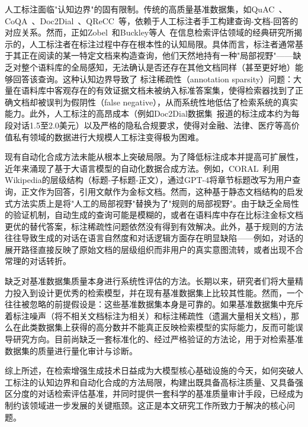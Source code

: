 人工标注面临"认知边界"的固有限制。传统的高质量基准数据集，如QuAC~\citep{choi-etal-2018-quac}、CoQA~\citep{reddy-etal-2019-coqa}、Doc2Dial~\citep{feng-etal-2020-doc2dial}、QReCC~\citep{anantha-etal-2021-qrecc}等，依赖于人工标注者手工构建查询-文档-回答的对应关系。然而，正如Zobel~\citep{zobel1998reliable}和Buckley等人~\citep{buckley2004retrieval}在信息检索评估领域的经典研究所揭示的，人工标注者在标注过程中存在根本性的认知局限。具体而言，标注者通常基于其正在阅读的某一特定文档来构造查询，他们天然地持有一种"局部视野"——缺乏对整个语料库的全局感知，无法确认是否还存在其他文档同样（甚至更好地）能够回答该查询。这种认知边界导致了 标注稀疏性（annotation sparsity）问题：大量在语料库中客观存在的有效证据文档未被纳入标准答案集，使得检索器找到了正确文档却被误判为假阴性（false negative），从而系统性地低估了检索系统的真实能力。此外，人工标注的高昂成本（例如Doc2Dial数据集~\citep{feng-etal-2020-doc2dial}报道的标注成本约为每段对话1.5至2.0美元）以及严格的隐私合规要求，使得对金融、法律、医疗等高价值私有领域的数据进行大规模人工标注变得极为困难。

现有自动化合成方法未能从根本上突破局限。为了降低标注成本并提高可扩展性，近年来涌现了基于大语言模型的自动化数据合成方法。例如，CORAL~\citep{coral2025}利用Wikipedia的层级结构（标题-子标题-正文），通过GPT-4将章节标题改写为用户查询，正文作为回答，引用文献作为金标文档。然而，这种基于静态文档结构的启发式方法实质上是将"人工的局部视野"替换为了"规则的局部视野"。由于缺乏全局性的验证机制，自动生成的查询可能是模糊的，或者在语料库中存在比标注金标文档更优的替代答案，标注稀疏性问题依然没有得到有效解决。此外，基于规则的方法往往导致生成的对话在语言自然度和对话逻辑方面存在明显缺陷——例如，对话的展开路径直接反映了原始文档的层级组织而非用户的真实意图流转，或者出现不合常理的对话转折。

缺乏对基准数据集质量本身进行系统性评估的方法。长期以来，研究者们将大量精力投入到设计更优秀的检索模型，并在现有基准数据集上比较其性能。然而，一个往往被忽略的前提假设是：这些基准数据集本身是可靠的。如果基准数据集中充斥着标注噪声（将不相关文档标注为相关）和标注稀疏性（遗漏大量相关文档），那么在此类数据集上获得的高分数并不能真正反映检索模型的实际能力，反而可能误导研究方向。目前尚缺乏一套标准化的、经过严格验证的方法论，用于对检索基准数据集的质量进行量化审计与诊断。

综上所述，在检索增强生成技术日益成为大模型核心基础设施的今天，如何突破人工标注的认知边界和自动化合成的方法局限，构建出既具备高标注质量、又具备强区分度的对话检索评估基准，并同时提供一套科学的基准质量审计手段，已经成为制约该领域进一步发展的关键瓶颈。这正是本文研究工作所致力于解决的核心问题。

